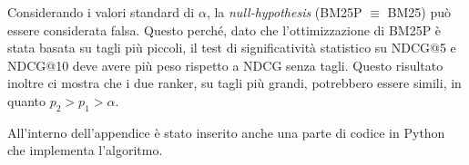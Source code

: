 Considerando i valori standard di $\alpha$, la \textit{null-hypothesis} (BM25P $\equiv$ BM25) può essere considerata falsa.
Questo perché, dato che l'ottimizzazione di BM25P è stata basata su tagli più piccoli, il test di significatività statistico su NDCG@5 e NDCG@10 
deve avere più peso rispetto a NDCG senza tagli.
Questo risultato inoltre ci mostra che i due ranker, su tagli più grandi, potrebbero essere simili, in quanto $p_2 > p_1 > \alpha$.

All'interno dell'appendice è stato inserito anche una parte di codice in Python che implementa
l'algoritmo.

